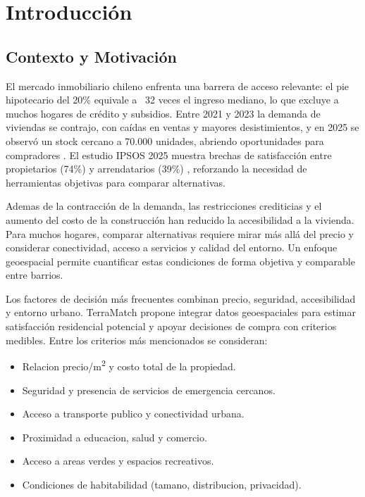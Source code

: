 \documentclass[11pt,letterpaper]{article}
\begin{document}

\newpage
\tableofcontents
\newpage


\section{Introducción}

\subsection{Contexto y Motivación}
El mercado inmobiliario chileno enfrenta una barrera de acceso relevante: el pie hipotecario del 20\% equivale a ~32 veces el ingreso mediano, lo que excluye a muchos hogares de crédito y subsidios. Entre 2021 y 2023 la demanda de viviendas se contrajo, con caídas en ventas y mayores desistimientos, y en 2025 se observó un stock cercano a 70.000 unidades, abriendo oportunidades para compradores \cite{biobio_ciper_2025}. El estudio IPSOS 2025 muestra brechas de satisfacción entre propietarios (74\%) y arrendatarios (39\%) \cite{ipsos_monitor_2025}, reforzando la necesidad de herramientas objetivas para comparar alternativas.

Ademas de la contracción de la demanda, las restricciones crediticias y el aumento del costo de la construcción han reducido la accesibilidad a la vivienda. Para muchos hogares, comparar alternativas requiere mirar más allá del precio y considerar conectividad, acceso a servicios y calidad del entorno. Un enfoque geoespacial permite cuantificar estas condiciones de forma objetiva y comparable entre barrios.

Los factores de decisión más frecuentes combinan precio, seguridad, accesibilidad y entorno urbano. TerraMatch propone integrar datos geoespaciales para estimar satisfacción residencial potencial y apoyar decisiones de compra con criterios medibles. Entre los criterios más mencionados se consideran:

\begin{itemize}
    \item Relacion precio/m\textsuperscript{2} y costo total de la propiedad.
    \item Seguridad y presencia de servicios de emergencia cercanos.
    \item Acceso a transporte publico y conectividad urbana.
    \item Proximidad a educacion, salud y comercio.
    \item Acceso a areas verdes y espacios recreativos.
    \item Condiciones de habitabilidad (tamano, distribucion, privacidad).
\end{itemize}
\end{document}
